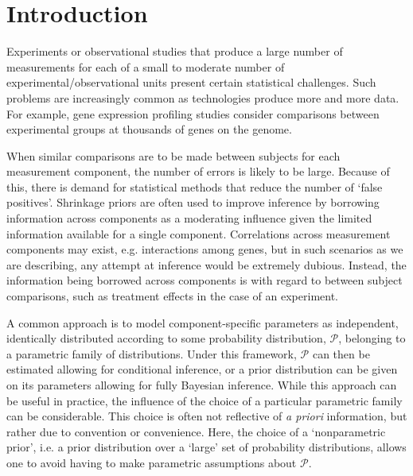 \newcommand{\ind}{\stackrel{ind.}{\sim}}
\newcommand{\op}{\operatorname}
\newcommand{\code}{\texttt}

\section{Introduction}
Experiments or observational studies that produce a large number of measurements for each of a small to moderate number of experimental/observational units present certain statistical challenges. Such problems are increasingly common as technologies produce more and more data. For example, gene expression profiling studies consider comparisons between experimental groups at thousands of genes on the genome.

When similar comparisons are to be made between subjects for each measurement component, the number of errors is likely to be large. Because of this, there is demand for statistical methods that reduce the number of `false positives'. Shrinkage priors are often used to improve inference by borrowing information across components as a moderating influence given the limited information available for a single component. Correlations across measurement components may exist, e.g. interactions among genes, but in such scenarios as we are describing, any attempt at inference would be extremely dubious. Instead, the information being borrowed across components is with regard to between subject comparisons, such as treatment effects in the case of an experiment.


A common approach is to model component-specific parameters as independent, identically distributed according to some probability distribution, $\mathcal{P}$, belonging to a parametric family of distributions. Under this framework, $\mathcal{P}$ can then be estimated allowing for conditional inference, or a prior distribution can be given on its parameters allowing for fully Bayesian inference. While this approach can be useful in practice, the influence of the choice of a particular parametric family can be considerable. This choice is often not reflective of \textit{a priori} information, but rather due to convention or convenience. Here, the choice of a `nonparametric prior', i.e. a prior distribution over a `large' set of probability distributions, allows one to avoid having to make parametric assumptions about $\mathcal{P}$. 

